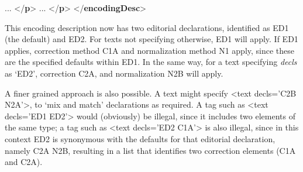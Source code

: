 \begin{shaded}
\hspace*{1em}\mbox{}\newline 
\hspace*{1em}\mbox{}\newline 
\hspace*{1em}\hspace*{1em} ... {</\textbf{p}>}\mbox{}\newline 
\hspace*{1em}\mbox{}\newline 
\hspace*{1em}\mbox{}\newline 
\hspace*{1em}\hspace*{1em} ... {</\textbf{p}>}\mbox{}\newline 
\hspace*{1em}\mbox{}\newline 
{}\mbox{}\newline 
{</\textbf{encodingDesc}>}\end{shaded}\egroup\par \par
This encoding description now has two editorial declarations, identified as ED1 (the default) and ED2. For texts not specifying otherwise, ED1 will apply. If ED1 applies, correction method C1A and normalization method N1 apply, since these are the specified defaults within ED1. In the same way, for a text specifying {\itshape decls} as ‘ED2’, correction C2A, and normalization N2B will apply.\par
A finer grained approach is also possible. A text might specify <text decls='C2B N2A'>, to ‘mix and match’ declarations as required. A tag such as <text decls='ED1 ED2'> would (obviously) be illegal, since it includes two elements of the same type; a tag such as <text decls='ED2 C1A'> is also illegal, since in this context ED2 is synonymous with the defaults for that editorial declaration, namely C2A N2B, resulting in a list that identifies two correction elements (C1A and C2A).
